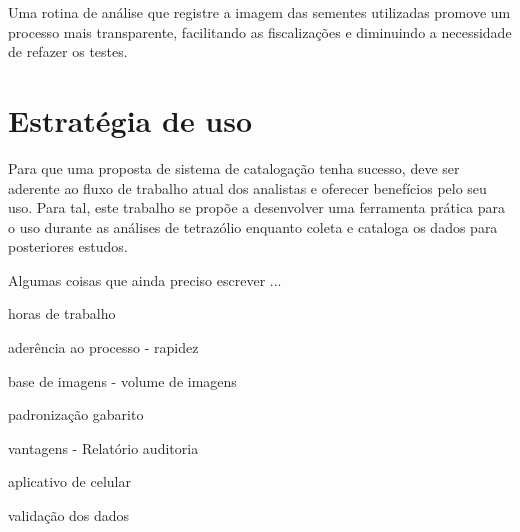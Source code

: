 Uma rotina de análise que registre a imagem das sementes utilizadas promove um processo mais transparente, facilitando as fiscalizações e diminuindo a necessidade de refazer os testes.


\section{Estratégia de uso} 

Para que uma proposta de sistema de catalogação tenha sucesso, deve ser aderente ao fluxo de trabalho atual dos analistas e oferecer benefícios pelo seu uso. Para tal, este trabalho se propõe a desenvolver uma ferramenta prática para o uso durante as análises de tetrazólio enquanto coleta e cataloga os dados para posteriores estudos. 


Algumas coisas que ainda preciso escrever ...

horas de trabalho

aderência ao processo - rapidez

base de imagens - volume de imagens

padronização
gabarito

vantagens - Relatório
auditoria

aplicativo de celular

validação dos dados


